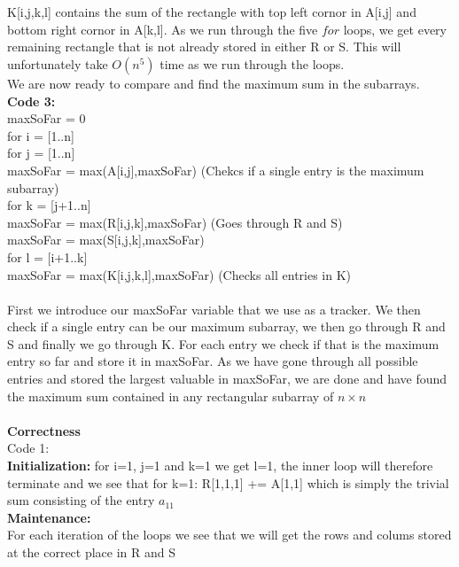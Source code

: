 \documentclass{article}
\theoremstyle{remark}
\numberwithin{equation}{section}
\begin{document}
\\
\\K[i,j,k,l] contains the sum of the rectangle with top left cornor in A[i,j] and bottom right cornor in A[k,l]. As we run through the five $ for $ loops, we get every remaining rectangle that is not already stored in either R or S. This will unfortunately take $O(n^5)$ time as we run through the loops.
\\ We are now ready to compare and find the maximum sum in the subarrays.
\\\newpage
\textbf{Code 3:}
\\maxSoFar = 0
\\for i = [1..n]
\\\indent for j = [1..n]
\\\indent\indent maxSoFar = max(A[i,j],maxSoFar) \indent (Chekcs if a single entry is the maximum subarray)
\\\indent\indent for k = [j+1..n]
\\\indent\indent\indent maxSoFar = max(R[i,j,k],maxSoFar) \indent \indent (Goes through R and S)
\\\indent\indent\indent maxSoFar = max(S[i,j,k],maxSoFar)
\\\indent\indent\indent for l = [i+1..k]
\\\indent\indent\indent\indent maxSoFar = max(K[i,j,k,l],maxSoFar) \indent (Checks all entries in K)
\\
\\First we introduce our maxSoFar variable that we use as a tracker. We then check if a single entry can be our maximum subarray, we then go through R and S and finally we go through K. For each entry we check if that is the maximum entry so far and store it in maxSoFar. As we have gone through all possible entries and stored the largest valuable in maxSoFar, we are done and have found the maximum sum contained in any rectangular subarray of $ n\times n $
\\
\\
\textbf{Correctness}
\\Code 1:
\\ \textbf{Initialization:} for i=1, j=1 and k=1 we get l=1, the inner loop will therefore terminate and we see that for k=1: R[1,1,1] += A[1,1] which is simply the trivial sum consisting of the entry $ a_{11} $  
\\ \textbf{Maintenance:}
\\ For each iteration of the loops we see that we will get the rows and colums stored at the correct place in R and S
\end{document}
